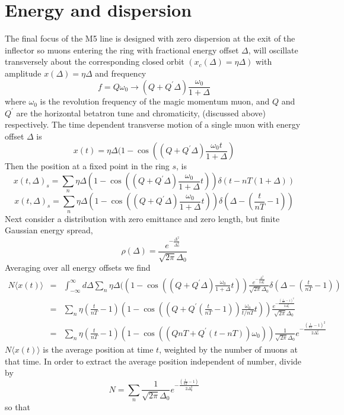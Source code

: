 \documentclass[10pt]{article}
\begin{document}
\section{Energy and dispersion}
The final focus of the M5 line is designed with zero dispersion at the
exit of the inflector\cite{rubin} so  muons entering the ring with fractional energy offset $\Delta$, 
will oscillate transversely about the corresponding closed orbit $(x_c(\Delta)=\eta\Delta)$ with 
amplitude $x(\Delta)=\eta\Delta$ and frequency 
$$ f=Q\omega_0 \rightarrow (Q+Q^\prime\Delta)\frac{\omega_0}{1+\Delta}$$
where $\omega_0$ is the revolution frequency of the magic momentum muon, and $Q$ and $Q^\prime$ are the
horizontal betatron tune and chromaticity, (discussed above) respectively.
The time dependent transverse motion of a single muon with energy offset $\Delta$ is
$$x(t) = \eta\Delta(1-\cos\left((Q+Q^\prime\Delta)\frac{\omega_0 t}{1+\Delta} \right)$$
Then the position at a fixed point in the ring $s$, is
$$x(t,\Delta)_s = \sum_n\eta\Delta\left(1-\cos\left( (Q+Q^\prime\Delta)\frac{\omega_0}{1+\Delta}   t\right)\right)\delta(t-nT(1+\Delta))$$
$$x(t,\Delta)_s = \sum_n\eta\Delta\left(1-\cos\left((Q+Q^\prime\Delta)\frac{\omega_0}{1+\Delta} t\right)\right)\delta(\Delta - (\frac{t}{nT}-1))$$
Next consider a distribution with zero emittance and zero length, but finite Gaussian energy spread,
$$\rho(\Delta) = \frac{e^{-\frac{\Delta^2}{\Delta_0^2}}}{\sqrt{2\pi}\Delta_0}$$ 
Averaging over all energy offsets we find
\begin{eqnarray*}
N\langle x(t)\rangle &=&
\int_{-\infty}^\infty d\Delta\sum_n\eta\Delta(\left(1-\cos\left((Q+Q^\prime\Delta)\frac{\omega_0}{1+\Delta} t\right)\right)\frac{e^{-\frac{\Delta^2}{2\Delta_0^2}}}{\sqrt{2\pi}\Delta_0}\delta(\Delta-(\frac{t}{nT}-1))\\
&=&
\sum_n\eta(\frac{t}{nT}-1)\left(1-\cos\left((Q+ Q^\prime(\frac{t}{nT}-1))\frac{\omega_0}{t/nT} t\right)\right)\frac{e^{-\frac{(\frac{t}{nT}-1)^2}{2\Delta_0^2}}}{\sqrt{2\pi}\Delta_0}\\
&=&\sum_n\eta(\frac{t}{nT}-1)\left(1-\cos\left((QnT+ Q^\prime(t-nT))\omega_0 \right)\right)\frac{1}{\sqrt{2\pi}\Delta_0}e^{-\frac{(\frac{t}{nT}-1)^2}{2\Delta_0^2}}
\end{eqnarray*}
$N\langle x(t)\rangle$ is the average position at time $t$, weighted by the number of muons at that time.
In order to extract the average position independent of number, divide by
$$N = \sum_n \frac{1}{\sqrt{2\pi}\Delta_0}e^{-\frac{(\frac{t}{nT}-1)}{2\Delta_0^2}}$$
so that
\end{document}
